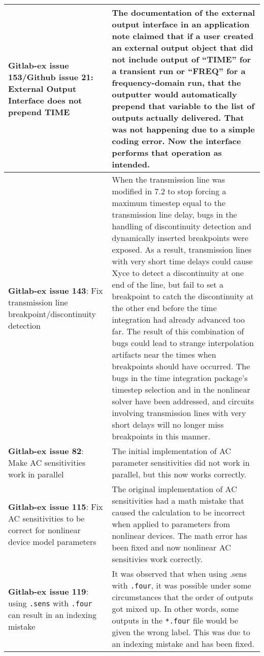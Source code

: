 {\begin{longtable}[h] {>{\raggedright\small}m{2in}|>{\raggedright\let\\\tabularnewline\small}m{3.5in}}
\textbf{Gitlab-ex issue 153/Github issue 21}: External Output Interface does not prepend TIME &
The documentation of the external output interface in an application
note claimed that if a user created an external output object that did
not include output of ``TIME'' for a transient run or ``FREQ'' for a
frequency-domain run, that the outputter would automatically prepend
that variable to the list of outputs actually delivered.  That was not
happening due to a simple coding error.  Now the interface performs
that operation as intended. \\ \hline

\textbf{Gitlab-ex issue 143}: Fix transmission line breakpoint/discontinuity detection &
When the transmission line was modified in \Xyce{} 7.2 to stop forcing
a maximum timestep equal to the transmission line delay, bugs in the
handling of discontinuity detection and dynamically inserted
breakpoints were exposed.  As a result, transmission lines with very
short time delays could cause Xyce to detect a discontinuity at one
end of the line, but fail to set a breakpoint to catch the
discontinuity at the other end before the time integration had already
advanced too far.  The result of this combination of bugs could lead
to strange interpolation artifacts near the times when breakpoints
should have occurred.  The bugs in the time integration package's
timestep selection and in the nonlinear solver have been addressed,
and circuits involving transmission lines with very short delays will
no longer miss breakpoints in this manner. \\ \hline

\textbf{Gitlab-ex issue 82}:  Make AC sensitivities work in parallel &
The initial implementation of AC parameter sensitivities did not work in 
  parallel, but this now works correctly.
\\ \hline

\textbf{Gitlab-ex issue 115}:  Fix AC sensitivities to be correct for nonlinear 
  device model parameters & The original implementation of AC sensitivities had 
  a math mistake that caused the calculation to be incorrect when applied to 
  parameters from nonlinear devices.  The math error has been fixed and now
  nonlinear AC sensitivies work correctly.
\\ \hline

\textbf{Gitlab-ex issue 119}:  using \texttt{.sens} with \texttt{.four} can result in an indexing mistake & 
  It was observed that when using .sens with \texttt{.four}, it was possible under some circumstances 
  that the order of outputs got mixed up.  In other words, some outputs in the \texttt{*.four}
  file would be given the wrong label.  This was due to an indexing mistake 
  and has been fixed.
\\ \hline


\end{longtable}}
